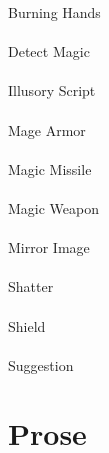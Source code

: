 \documentclass[letterpaper]{article}
\begin{document}
{
    \Large \wizpenfont \noindent %
    Burning Hands \\ \\
    Detect Magic \\ \\
    Illusory Script \\ \\
    Mage Armor \\ \\
    Magic Missile \\ \\
    Magic Weapon \\ \\
    Mirror Image \\ \\
    Shatter \\ \\
    Shield \\ \\
    Suggestion \\
}

\clearpage

\section*{Prose}

{
    \Large \wizpenfont \noindent %
    \begin{sloppypar}
        \blindtext
    \end{sloppypar}
}
\end{document}
